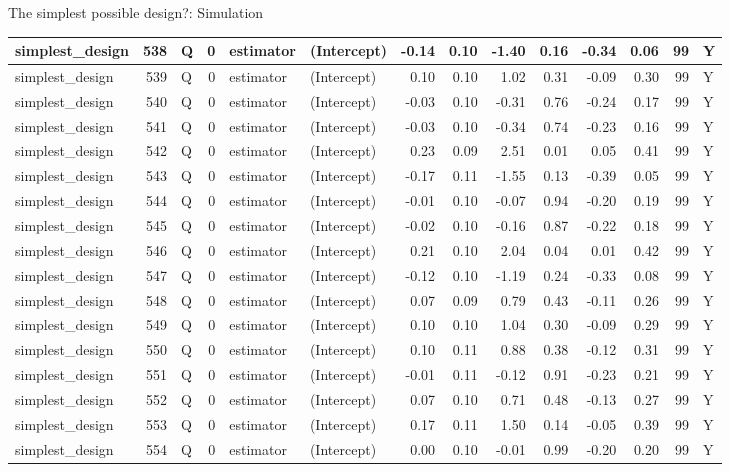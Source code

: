 \documentclass[
  11pt,
  ignorenonframetext,
]{beamer}
\begin{document}
\begin{frame}[fragile]{The simplest possible design?: Simulation}
\begin{tabular}{l|r|l|r|l|l|r|r|r|r|r|r|r|l}
\hline
simplest\_design & 538 & Q & 0 & estimator & (Intercept) & -0.14 & 0.10 & -1.40 & 0.16 & -0.34 & 0.06 & 99 & Y\\
\hline
simplest\_design & 539 & Q & 0 & estimator & (Intercept) & 0.10 & 0.10 & 1.02 & 0.31 & -0.09 & 0.30 & 99 & Y\\
\hline
simplest\_design & 540 & Q & 0 & estimator & (Intercept) & -0.03 & 0.10 & -0.31 & 0.76 & -0.24 & 0.17 & 99 & Y\\
\hline
simplest\_design & 541 & Q & 0 & estimator & (Intercept) & -0.03 & 0.10 & -0.34 & 0.74 & -0.23 & 0.16 & 99 & Y\\
\hline
simplest\_design & 542 & Q & 0 & estimator & (Intercept) & 0.23 & 0.09 & 2.51 & 0.01 & 0.05 & 0.41 & 99 & Y\\
\hline
simplest\_design & 543 & Q & 0 & estimator & (Intercept) & -0.17 & 0.11 & -1.55 & 0.13 & -0.39 & 0.05 & 99 & Y\\
\hline
simplest\_design & 544 & Q & 0 & estimator & (Intercept) & -0.01 & 0.10 & -0.07 & 0.94 & -0.20 & 0.19 & 99 & Y\\
\hline
simplest\_design & 545 & Q & 0 & estimator & (Intercept) & -0.02 & 0.10 & -0.16 & 0.87 & -0.22 & 0.18 & 99 & Y\\
\hline
simplest\_design & 546 & Q & 0 & estimator & (Intercept) & 0.21 & 0.10 & 2.04 & 0.04 & 0.01 & 0.42 & 99 & Y\\
\hline
simplest\_design & 547 & Q & 0 & estimator & (Intercept) & -0.12 & 0.10 & -1.19 & 0.24 & -0.33 & 0.08 & 99 & Y\\
\hline
simplest\_design & 548 & Q & 0 & estimator & (Intercept) & 0.07 & 0.09 & 0.79 & 0.43 & -0.11 & 0.26 & 99 & Y\\
\hline
simplest\_design & 549 & Q & 0 & estimator & (Intercept) & 0.10 & 0.10 & 1.04 & 0.30 & -0.09 & 0.29 & 99 & Y\\
\hline
simplest\_design & 550 & Q & 0 & estimator & (Intercept) & 0.10 & 0.11 & 0.88 & 0.38 & -0.12 & 0.31 & 99 & Y\\
\hline
simplest\_design & 551 & Q & 0 & estimator & (Intercept) & -0.01 & 0.11 & -0.12 & 0.91 & -0.23 & 0.21 & 99 & Y\\
\hline
simplest\_design & 552 & Q & 0 & estimator & (Intercept) & 0.07 & 0.10 & 0.71 & 0.48 & -0.13 & 0.27 & 99 & Y\\
\hline
simplest\_design & 553 & Q & 0 & estimator & (Intercept) & 0.17 & 0.11 & 1.50 & 0.14 & -0.05 & 0.39 & 99 & Y\\
\hline
simplest\_design & 554 & Q & 0 & estimator & (Intercept) & 0.00 & 0.10 & -0.01 & 0.99 & -0.20 & 0.20 & 99 & Y\\

\end{tabular}
\end{frame}
\end{document}
